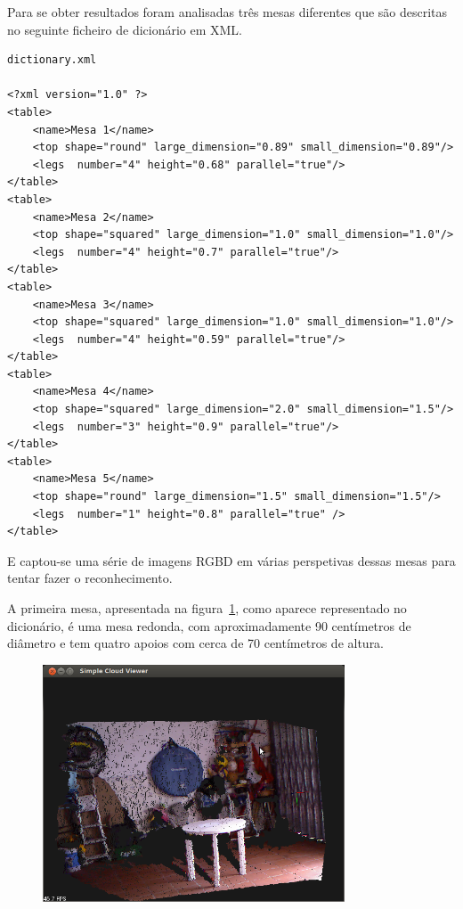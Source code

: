 Para se obter resultados foram analisadas três mesas diferentes que são descritas no seguinte ficheiro de dicionário em XML. 

\begin{verbatim}
dictionary.xml

<?xml version="1.0" ?>
<table>
	<name>Mesa 1</name>
	<top shape="round" large_dimension="0.89" small_dimension="0.89"/>
	<legs  number="4" height="0.68" parallel="true"/>
</table>
<table>
	<name>Mesa 2</name>
	<top shape="squared" large_dimension="1.0" small_dimension="1.0"/>
	<legs  number="4" height="0.7" parallel="true"/>
</table>
<table>
	<name>Mesa 3</name>
	<top shape="squared" large_dimension="1.0" small_dimension="1.0"/>
	<legs  number="4" height="0.59" parallel="true"/>
</table>
<table>
	<name>Mesa 4</name>
	<top shape="squared" large_dimension="2.0" small_dimension="1.5"/>
	<legs  number="3" height="0.9" parallel="true"/>
</table>
<table>
	<name>Mesa 5</name>
	<top shape="round" large_dimension="1.5" small_dimension="1.5"/>
	<legs  number="1" height="0.8" parallel="true" />
</table>
\end{verbatim}

E captou-se uma série de imagens RGBD em várias perspetivas dessas mesas para tentar fazer o reconhecimento.

A primeira mesa, apresentada na figura~\ref{fig:mesa1}, como aparece representado no dicionário, é uma mesa redonda, com aproximadamente 90 centímetros de diâmetro e tem quatro apoios com cerca de 70 centímetros de altura.

\begin{figure}[htb]
\begin{center}
	\includegraphics[width=0.80\textwidth]{figures/exemplo_captura.png}
	\label{fig:mesa1}
\end{center}
\end{figure}


